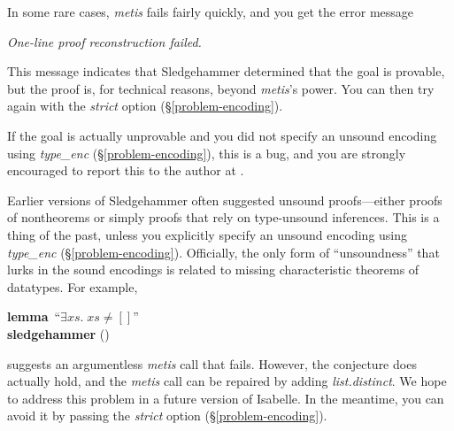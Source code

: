 \documentclass[a4paper,12pt]{article}
\begin{document}
In some rare cases, \textit{metis} fails fairly quickly, and you get the error
message

\prew
\slshape
One-line proof reconstruction failed.
\postw

This message indicates that Sledgehammer determined that the goal is provable,
but the proof is, for technical reasons, beyond \textit{metis}'s power. You can
then try again with the \textit{strict} option (\S\ref{problem-encoding}).

If the goal is actually unprovable and you did not specify an unsound encoding
using \textit{type\_enc} (\S\ref{problem-encoding}), this is a bug, and you are
strongly encouraged to report this to the author at \authoremail.


Earlier versions of Sledgehammer often suggested unsound proofs---either proofs
of nontheorems or simply proofs that rely on type-unsound inferences. This
is a thing of the past, unless you explicitly specify an unsound encoding
using \textit{type\_enc} (\S\ref{problem-encoding}).
%
Officially, the only form of ``unsoundness'' that lurks in the sound
encodings is related to missing characteristic theorems of datatypes. For
example,

\prew
\textbf{lemma}~``$\exists \mathit{xs}.\; \mathit{xs} \neq []$'' \\
\textbf{sledgehammer} ()
\postw

suggests an argumentless \textit{metis} call that fails. However, the conjecture
does actually hold, and the \textit{metis} call can be repaired by adding
\textit{list.distinct}.
%
We hope to address this problem in a future version of Isabelle. In the
meantime, you can avoid it by passing the \textit{strict} option
(\S\ref{problem-encoding}).

\end{document}
